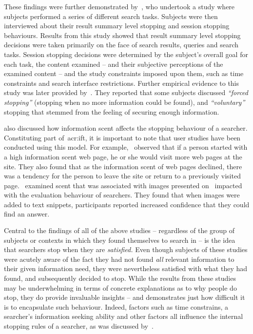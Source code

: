 These findings were further demonstrated by~\cite{wu2014information_scent}, who undertook a study where subjects performed a series of different search tasks. Subjects were then interviewed about their result summary level stopping and session stopping behaviours. Results from this study showed that result summary level stopping decisions were taken primarily on the face of search results, queries and search tasks. Session stopping decisions were determined by the subject's overall goal for each task, the content examined -- and their subjective perceptions of the examined content -- and the study constraints imposed upon them, such as time constraints and search interface restrictions. Further empirical evidence to this study was later provided by~\cite{wu2014stopping_query_abandonment}. They reported that some subjects discussed \emph{``forced stopping''} (stopping when no more information could be found), and \emph{``voluntary''} stopping that stemmed from the feeling of securing enough information.

\cite{wu2014information_scent} also discussed how information scent affects the stopping behaviour of a searcher. Constituting part of~\gls{acr:ift}, it is important to note that user studies have been conducted using this model. For example,~\cite{card2001scent_graphs} observed that if a person started with a high information scent web page, he or she would visit more web pages at the site. They also found that as the information scent of web pages declined, there was a tendency for the person to leave the site or return to a previously visited page.~\cite{loumakis2011image_smells} examined scent that was associated with images presented on~ impacted with the evaluation behaviour of searchers. They found that when images were added to text snippets, participants reported increased confidence that they could find an answer.

Central to the findings of all of the above studies -- regardless of the group of subjects or contexts in which they found themselves to search in -- is the idea that searchers stop when they are \emph{satisfied.} Even though subjects of these studies were acutely aware of the fact they had not found \emph{all} relevant information to their given information need, they were nevertheless satisfied with what they had found, and subsequently decided to stop. While the results from these studies may be underwhelming in terms of concrete explanations as to why people do stop, they do provide invaluable insights -- and demonstrates just how difficult it is to encapsulate such behaviour. Indeed, factors such as time constrains, a searcher's information seeking ability and other factors all influence the internal stopping rules of a searcher, as was discussed by~\cite{marchionini1995information_seeking}. 

